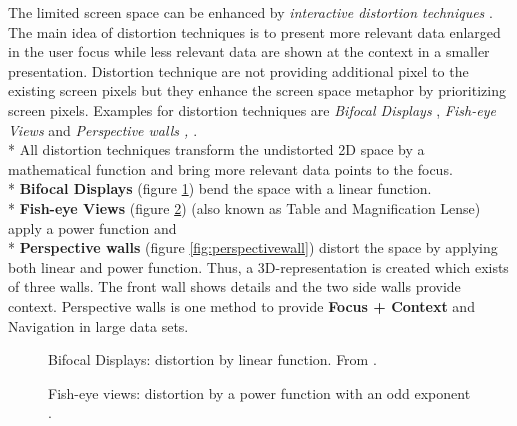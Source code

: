 The limited screen space can be enhanced by \textit{interactive distortion techniques} \cite{Mackinlay1991}.
The main idea of distortion techniques is to present more relevant data enlarged in the user focus while less relevant data are shown at the context in a smaller presentation. Distortion technique are not providing additional pixel to the existing screen pixels but they enhance the screen space metaphor by prioritizing screen pixels.
Examples for distortion techniques are \textit{Bifocal Displays}  \cite{Spence1982}, \textit{Fish-eye Views} and \textit{Perspective walls \cite{Keim2005},  \cite{Mackinlay1991}}.\\*
All distortion techniques transform the undistorted 2D space by a mathematical function and bring more relevant data points to the focus.\\* 
\textbf{Bifocal Displays} (figure \ref{fig:bifocal}) bend the space with a linear function.\\*
\textbf{Fish-eye Views} (figure \ref{fig:fisheye}) (also known as Table and Magnification Lense) apply a power function and\\*
\textbf{Perspective walls} (figure \ref{fig:perspectivewall}) distort the space by applying both linear and power function. Thus, a 3D-representation is created which exists of three walls. The front wall shows details and the two side walls provide context. Perspective walls is one method to provide \textbf{Focus + Context} and Navigation in large data sets.
\begin{figure}[H]
    \centering
    \caption{Bifocal Displays: distortion by linear function. From  \cite{Stroe1999}.}
    \label{fig:bifocal}
\end{figure}

\begin{figure}[H]
    \centering
    \caption{Fish-eye views:  distortion by a power function with an odd exponent  \cite{Stroe1999}.}
    \label{fig:fisheye}
\end{figure}


